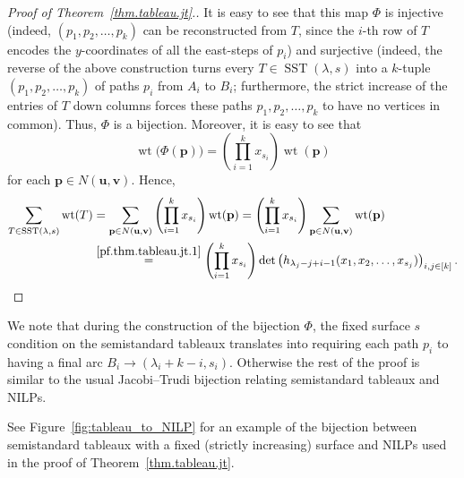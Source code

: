 \documentclass[reqno]{amsart}
\newcommand{\0}{\phantom{c}}
\DeclareMathOperator{\wt}{wt} %
\DeclareMathOperator{\SST}{SST} %
\newcommand{\pp}{\mathbf{p}}
\newcommand{\uu}{\mathbf{u}}
\newcommand{\vv}{\mathbf{v}}
\let\sumnonlimits\sum
\let\prodnonlimits\prod
\renewcommand{\sum}{\sumnonlimits\limits}
\renewcommand{\prod}{\prodnonlimits\limits}
\newenvironment{verlong}{}{}
\newcommand{\tup}[1]{\left( #1 \right)}
\newcommand{\ive}[1]{\left[ #1 \right]}
\theoremstyle{plain}
\theoremstyle{definition}
\numberwithin{equation}{section}
\begin{document}
\begin{verlong}
\begin{proof}[Proof of Theorem~\ref{thm.tableau.jt}.]
It is easy to see that this map $\Phi$ is injective (indeed, $\tup{p_1,p_2,\dotsc,p_k}$ can be reconstructed from $T$, since the $i$-th row of $T$ encodes the $y$-coordinates of all the east-steps of $p_i$) and surjective (indeed, the reverse of the above construction turns every $T \in \SST(\lambda, s)$ into a $k$-tuple $\tup{p_1, p_2, \dotsc, p_k}$ of paths $p_i$ from $A_i$ to $B_i$; furthermore, the strict increase of the entries of $T$ down columns forces these paths $p_1,p_2,\ldots,p_k$ to have no vertices in common).
Thus, $\Phi$ is a bijection.
Moreover, it is easy to see that
\[
\wt\bigl(  \Phi(\pp) \bigr) = \left( \prod_{i=1}^k x_{s_i} \right) \wt(\pp)
\]
for each $\pp \in N(\uu,\vv)$.
Hence,
\begin{align*}
\sum_{T \in \SST(\lambda, s)} \wt(T)  &  = \sum_{\pp\in N(\uu,\vv)  }\left( \prod_{i=1}^k x_{s_i} \right)  \wt(\pp)
= \left( \prod_{i=1}^k x_{s_i} \right) \sum_{\pp\in N(\uu,\vv)  } \wt(\pp) \\
&  \overset{\eqref{pf.thm.tableau.jt.1}}{=} \left(  \prod_{i=1}^k x_{s_i} \right)  \det\left( h_{\lambda_j-j+i-1}(x_1, x_2, \dotsc, x_{s_j}) \right)_{i, j \in \ive{k}}.
\end{align*}
\end{proof}

We note that during the construction of the bijection $\Phi$, the fixed surface $s$ condition on the semistandard tableaux translates into requiring each path $p_i$ to having a final arc $B_i \to (\lambda_i + k - i, s_i)$.
Otherwise the rest of the proof is similar to the usual Jacobi--Trudi bijection relating semistandard tableaux and NILPs.
\end{verlong}


See Figure~\ref{fig:tableau_to_NILP} for an example of the bijection between semistandard tableaux with a fixed (strictly increasing) surface and NILPs used in the proof of Theorem~\ref{thm.tableau.jt}.
\end{document}
